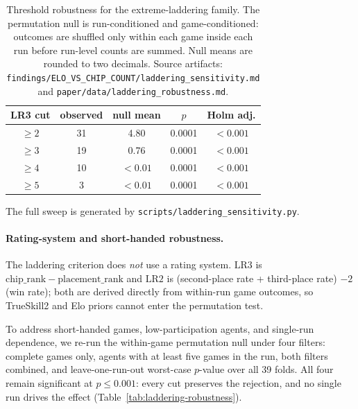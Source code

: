 \documentclass{article}
\begin{document}
\begin{table}[t]
    \centering
    \small
    \caption{Threshold robustness for the extreme-laddering family. The permutation null is run-conditioned and game-conditioned: outcomes are shuffled only within each game inside each run before run-level counts are summed. Null means are rounded to two decimals. Source artifacts: \texttt{findings/\allowbreak ELO\_VS\_CHIP\_COUNT/\allowbreak laddering\_sensitivity.md} and \texttt{paper/data/\allowbreak laddering\_robustness.md}.}
    \label{tab:laddering-threshold}
    \setlength{\tabcolsep}{4pt}
    \begin{tabular}{@{}ccccc@{}}
        \toprule
        LR3 cut & observed & null mean & $p$ & Holm adj. \\
        \midrule
        $\geq 2$ & 31 & 4.80 & 0.0001 & $< 0.001$ \\
        $\geq 3$ & 19 & 0.76 & 0.0001 & $< 0.001$ \\
        $\geq 4$ & 10 & $< 0.01$ & 0.0001 & $< 0.001$ \\
        $\geq 5$ & 3 & $< 0.01$ & 0.0001 & $< 0.001$ \\
        \bottomrule
    \end{tabular}
\end{table}

The full sweep is generated by \texttt{scripts/laddering\_sensitivity.py}.

\paragraph{Rating-system and short-handed robustness.}
The laddering criterion does \emph{not} use a rating system. $\mathrm{LR3}$ is $\mathrm{chip\_rank} - \mathrm{placement\_rank}$ and $\mathrm{LR2}$ is (second-place rate + third-place rate) $-2$ (win rate); both are derived directly from within-run game outcomes, so TrueSkill2 and Elo priors cannot enter the permutation test.

To address short-handed games, low-participation agents, and single-run dependence, we re-run the within-game permutation null under four filters: complete games only, agents with at least five games in the run, both filters combined, and leave-one-run-out worst-case $p$-value over all 39 folds.
All four remain significant at $p{\leq}0.001$: every cut preserves the rejection, and no single run drives the effect (Table~\ref{tab:laddering-robustness}).
\end{document}
